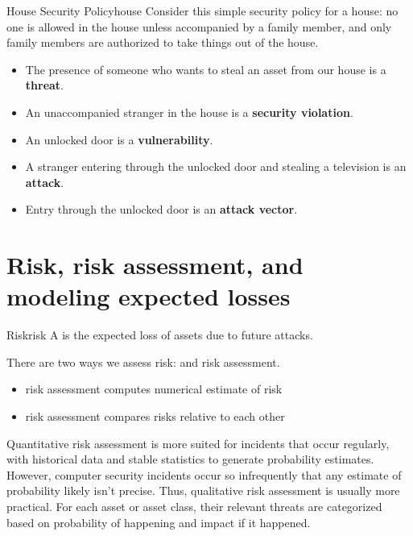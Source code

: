 \documentclass[code]{amznotes}
\begin{document}
\begin{exbox}{House Security Policy}{house}
    Consider this simple security policy for a house: no one is allowed in the house unless accompanied by a family member, and only family members are authorized to take things out of the house.
    \begin{itemize}[noitemsep]
        \item The presence of someone who wants to steal an asset from our house is a \textbf{threat}.
        \item An unaccompanied stranger in the house is a \textbf{security violation}.
        \item An unlocked door is a \textbf{vulnerability}.
        \item A stranger entering through the unlocked door and stealing a television is an \textbf{attack}.
        \item Entry through the unlocked door is an \textbf{attack vector}.
    \end{itemize}
\end{exbox}

\section{Risk, risk assessment, and modeling expected losses}

\begin{dfnbox}{Risk}{risk}
    A  is the expected loss of assets due to future attacks.
\end{dfnbox}

There are two ways we assess risk:  and  risk assessment.
\begin{itemize}
    \item {} risk assessment computes numerical estimate of risk
    \item {} risk assessment compares risks relative to each other
\end{itemize}

Quantitative risk assessment is more suited for incidents that occur regularly, with historical data and stable statistics to generate probability estimates. However, computer security incidents occur so infrequently that any estimate of probability likely isn't precise. Thus, qualitative risk assessment is usually more practical. For each asset or asset class, their relevant threats are categorized based on probability of happening and impact if it happened.
\end{document}
